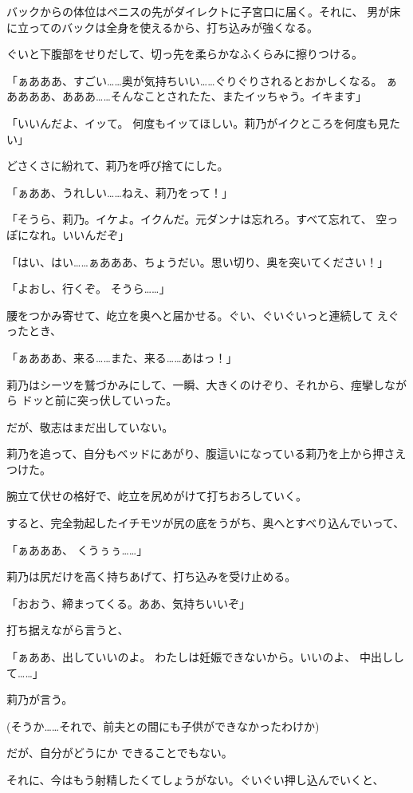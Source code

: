 ﻿\documentclass[
    book,tate,
    line_length=30zw,
    jafontsize=12pt,
    paper=b5j,
    landscape,
    ]{jlreq}
\begin{document}
バックからの体位はペニスの先がダイレクトに子宮口に届く。それに、
男が床に立ってのバックは全身を使えるから、打ち込みが強くなる。

ぐいと下腹部をせりだして、切っ先を柔らかなふくらみに擦りつける。

「ぁあああ、すごい……奥が気持ちいい……ぐりぐりされるとおかしくなる。 
ぁああああ、あああ……そんなことされたた、またイッちゃう。イキます」

「いいんだよ、イッて。 何度もイッてほしい。莉乃がイクところを何度も見たい」

どさくさに紛れて、莉乃を呼び捨てにした。

「ぁああ、うれしい……ねえ、莉乃をって！」

「そうら、莉乃。イケよ。イクんだ。元ダンナは忘れろ。すべて忘れて、
空っぽになれ。いいんだぞ」

「はい、はい……ぁあああ、ちょうだい。思い切り、奥を突いてください！」

「よおし、行くぞ。 そうら……」

腰をつかみ寄せて、屹立を奥へと届かせる。ぐい、ぐいぐいっと連続して
えぐったとき、

「ぁあああ、来る……また、来る……あはっ！」

莉乃はシーツを鷲づかみにして、一瞬、大きくのけぞり、それから、痙攣しながら
ドッと前に突っ伏していった。

だが、敬志はまだ出していない。

莉乃を追って、自分もベッドにあがり、腹這いになっている莉乃を上から押さえつけた。

腕立て伏せの格好で、屹立を尻めがけて打ちおろしていく。

すると、完全勃起したイチモツが尻の底をうがち、奥へとすべり込んでいって、

「ぁあああ、 くうぅぅ……」

莉乃は尻だけを高く持ちあげて、打ち込みを受け止める。

「おおう、締まってくる。ああ、気持ちいいぞ」

打ち据えながら言うと、

「ぁああ、出していいのよ。 わたしは妊娠できないから。いいのよ、
中出しして……」

莉乃が言う。

(そうか……それで、前夫との間にも子供ができなかったわけか)

だが、自分がどうにか
できることでもない。

それに、今はもう射精したくてしょうがない。ぐいぐい押し込んでいくと、
\end{document}
